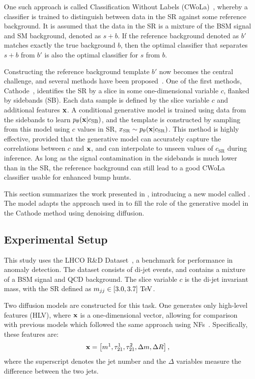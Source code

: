 One such approach is called Classification Without Labels (CWoLa)~\cite{cwola}, whereby a classifier is trained to distinguish between data in the SR against some reference background.
It is assumed that the data in the SR is a mixture of the BSM signal and SM background, denoted as $s+b$.
If the reference background denoted as $b'$ matches exactly the true background $b$, then the optimal classifier that separates $s+b$ from $b'$ is also the optimal classifier for $s$ from $b$.

Constructing the reference background template $b'$ now becomes the central challenge, and several methods have been proposed~\cite{cathode, salad, CURTAINs, feta, lacathode}.
One of the first methods, Cathode~\cite{cathode}, identifies the SR by a slice in some one-dimensional variable $c$, flanked by sidebands (SB).
Each data sample is defined by the slice variable $c$ and additional features $\mathbf{x}$.
A conditional generative model is trained using data from the sidebands to learn $p_\theta(\mathbf{x}|c_{\text{SB}})$, and the template is constructed by sampling from this model using $c$ values in SR, $x_{\text{SR}} \sim p_\theta(\mathbf{x}|c_{\text{SR}})$.
This method is highly effective, provided that the generative model can accurately capture the correlations between $c$ and $\mathbf{x}$, and can interpolate to unseen values of $c_\text{SR}$ during inference.
As long as the signal contamination in the sidebands is much lower than in the SR, the reference background can still lead to a good CWoLa classifier usable for enhanced bump hunts.

This section summarizes the work presented in \textcite{Drapes}, introducing a new model called \drapes.
The \drapes model adapts the approach used in \pcdroid to fill the role of the generative model in the Cathode method using denoising diffusion.

\subsection{Experimental Setup}

This study uses the LHCO R\&D Dataset~\cite{LHCO}, a benchmark for performance in anomaly detection.
The dataset consists of di-jet events, and contains a mixture of a BSM signal and QCD background.
The slice variable $c$ is the di-jet invariant mass, with the SR defined as $m_{jj} \in [3.0, 3.7]~\TeV$.

Two diffusion models are constructed for this task.
One generates only high-level features (\drapes HLV), where $\mathbf{x}$ is a one-dimensional vector, allowing for comparison with previous models which followed the same approach using NFs~\cite{cathode, CURTAINs, lacathode}.
Specifically, these features are:
\begin{equation}
    \mathbf{x} = \left[ m^{1}, \tau_{21}^{1}, \tau_{21}^{2}, \Delta m, \Delta R \right],
\end{equation}
where the superscript denotes the jet number and the $\Delta$ variables measure the difference between the two jets.

